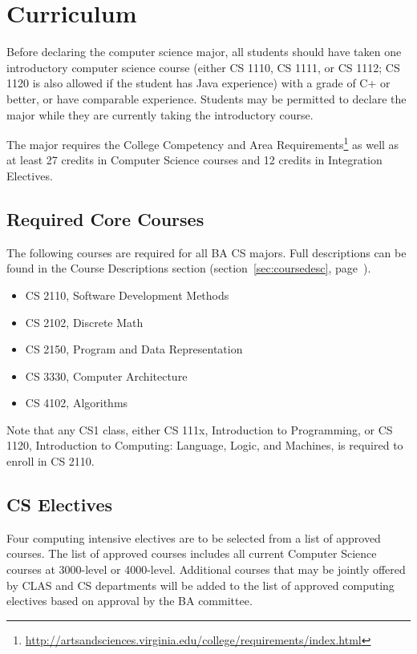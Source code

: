 \documentclass[10pt,letter,twocolumn]{book}
\newenvironment{itemlist}{
\begin{itemize}
\setlength{\itemsep}{0pt}
\setlength{\parskip}{0pt}}
{\end{itemize}}
\newcommand{\mysection}[1]{\section{#1}\renewcommand{\rightmark}{#1}}
\newcommand{\myurl}[1]{\footnote{\scriptsize\url{#1}}}
\begin{document}
\mysection{Curriculum}


Before declaring the computer science major, all students should have
taken one introductory computer science course (either CS 1110, CS
1111, or CS 1112; CS 1120 is also allowed if the student has Java
experience) with a grade of C+ or better, or have comparable
experience. Students may be permitted to declare the major while they
are currently taking the introductory course.

The major requires the College Competency and Area
Requirements\myurl{http://artsandsciences.virginia.edu/college/requirements/index.html}
as well as at least 27 credits in Computer Science courses and 12
credits in Integration Electives.

\subsection{Required Core Courses}
\label{sec:bacs-corecourses}

The following courses are required for all BA CS majors.  Full
descriptions can be found in the Course Descriptions section
(section~\ref{sec:coursedesc}, page~\pageref{sec:coursedesc}).

\begin{itemlist}
\item CS 2110, Software Development Methods
\item CS 2102, Discrete Math
\item CS 2150, Program and Data Representation
\item CS 3330, Computer Architecture
\item CS 4102, Algorithms
\end{itemlist}

Note that any CS1 class, either CS 111x, Introduction to Programming,
or CS 1120, Introduction to Computing: Language, Logic, and Machines,
is required to enroll in CS 2110.

\subsection{CS Electives}
\label{sec:bacs-cselectives}

Four computing intensive electives are to be selected from a list of
approved courses. The list of approved courses includes all 
current Computer Science courses at 3000-level or 4000-level. Additional 
courses that may be jointly offered by CLAS and CS
departments will be added to the list of approved computing electives
based on approval by the BA committee.
\end{document}
